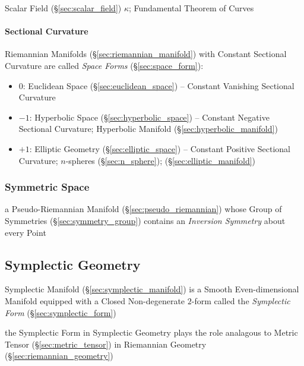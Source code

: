 Scalar Field (\S\ref{sec:scalar_field}) $\kappa$; Fundamental Theorem of Curves



\paragraph{Sectional Curvature}\label{sec:sectional_curvature}\hfill


Riemannian Manifolds (\S\ref{sec:riemannian_manifold}) with Constant Sectional
Curvature are called \emph{Space Forms} (\S\ref{sec:space_form}):
\begin{itemize}
  \item $0$: Euclidean Space (\S\ref{sec:euclidean_space}) -- Constant
    Vanishing Sectional Curvature
  \item $-1$: Hyperbolic Space (\S\ref{sec:hyperbolic_space}) -- Constant
    Negative Sectional Curvature; Hyperbolic Manifold
    (\S\ref{sec:hyperbolic_manifold})
  \item $+1$: Elliptic Geometry (\S\ref{sec:elliptic_space}) -- Constant
    Positive Sectional Curvature; $n$-spheres (\S\ref{sec:n_sphere});
    (\S\ref{sec:elliptic_manifold})
\end{itemize}



\subsubsection{Symmetric Space}\label{sec:symmetric_space}

a Pseudo-Riemannian Manifold (\S\ref{sec:pseudo_riemannian}) whose Group of
Symmetries (\S\ref{sec:symmetry_group}) contains an \emph{Inversion Symmetry}
about every Point



\subsection{Symplectic Geometry}\label{sec:symplectic_geometry}

Symplectic Manifold (\S\ref{sec:symplectic_manifold}) is a Smooth
Even-dimensional Manifold equipped with a Closed Non-degenerate $2$-form called
the \emph{Symplectic Form} (\S\ref{sec:symplectic_form})

the Symplectic Form in Symplectic Geometry plays the role analagous to Metric
Tensor (\S\ref{sec:metric_tensor}) in Riemannian Geometry
(\S\ref{sec:riemannian_geometry})

